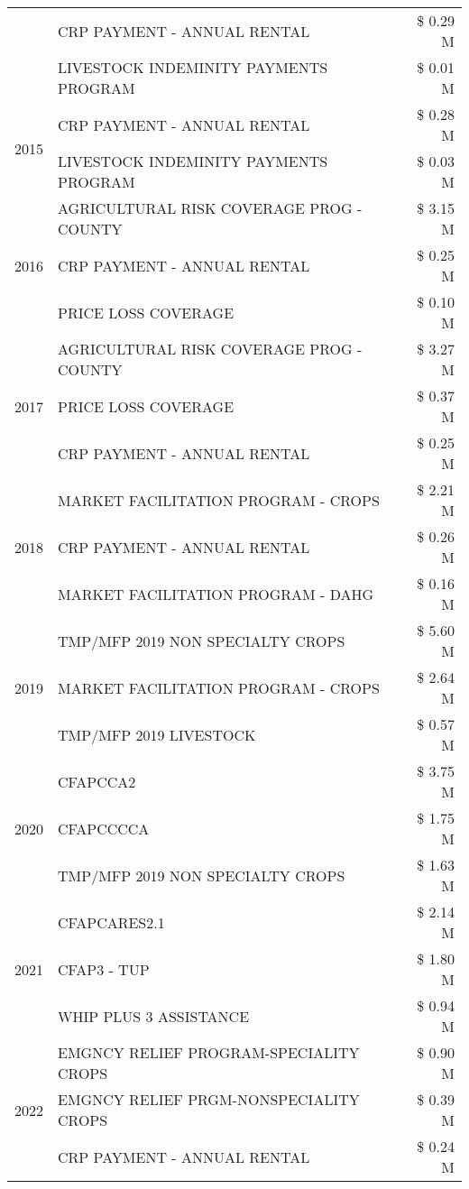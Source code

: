 \begin{tabular}{llr}
 & CRP PAYMENT - ANNUAL RENTAL & \$ 0.29 M \\
 & LIVESTOCK INDEMINITY PAYMENTS PROGRAM & \$ 0.01 M \\
\cline{1-3}
\multirow[t]{2}{*}{2015} & CRP PAYMENT - ANNUAL RENTAL & \$ 0.28 M \\
 & LIVESTOCK INDEMINITY PAYMENTS PROGRAM & \$ 0.03 M \\
\cline{1-3}
\multirow[t]{3}{*}{2016} & AGRICULTURAL RISK COVERAGE PROG - COUNTY & \$ 3.15 M \\
 & CRP PAYMENT - ANNUAL RENTAL & \$ 0.25 M \\
 & PRICE LOSS COVERAGE & \$ 0.10 M \\
\cline{1-3}
\multirow[t]{3}{*}{2017} & AGRICULTURAL RISK COVERAGE PROG - COUNTY & \$ 3.27 M \\
 & PRICE LOSS COVERAGE & \$ 0.37 M \\
 & CRP PAYMENT - ANNUAL RENTAL & \$ 0.25 M \\
\cline{1-3}
\multirow[t]{3}{*}{2018} & MARKET FACILITATION PROGRAM - CROPS & \$ 2.21 M \\
 & CRP PAYMENT - ANNUAL RENTAL & \$ 0.26 M \\
 & MARKET FACILITATION PROGRAM - DAHG & \$ 0.16 M \\
\cline{1-3}
\multirow[t]{3}{*}{2019} & TMP/MFP 2019 NON SPECIALTY CROPS & \$ 5.60 M \\
 & MARKET FACILITATION PROGRAM - CROPS & \$ 2.64 M \\
 & TMP/MFP 2019 LIVESTOCK & \$ 0.57 M \\
\cline{1-3}
\multirow[t]{3}{*}{2020} & CFAPCCA2 & \$ 3.75 M \\
 & CFAPCCCCA & \$ 1.75 M \\
 & TMP/MFP 2019 NON SPECIALTY CROPS & \$ 1.63 M \\
\cline{1-3}
\multirow[t]{3}{*}{2021} & CFAPCARES2.1 & \$ 2.14 M \\
 & CFAP3 - TUP & \$ 1.80 M \\
 & WHIP PLUS 3 ASSISTANCE & \$ 0.94 M \\
\cline{1-3}
\multirow[t]{3}{*}{2022} & EMGNCY RELIEF PROGRAM-SPECIALITY CROPS & \$ 0.90 M \\
 & EMGNCY RELIEF PRGM-NONSPECIALITY CROPS & \$ 0.39 M \\
 & CRP PAYMENT - ANNUAL RENTAL & \$ 0.24 M \\
\cline{1-3}
\bottomrule
\end{tabular}
